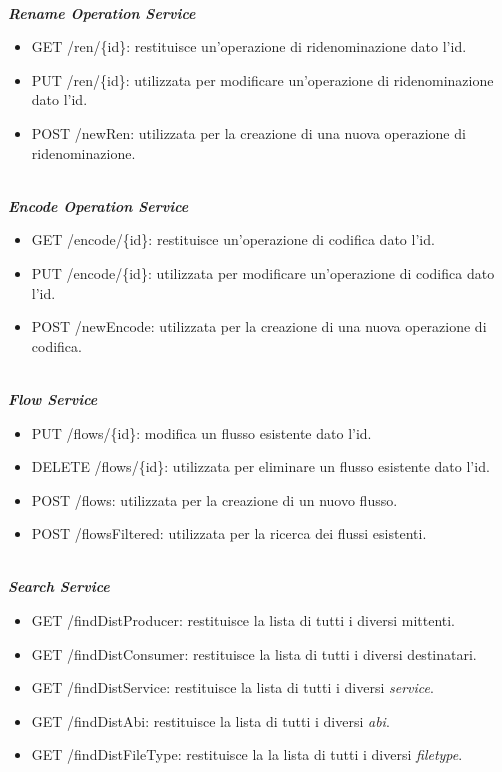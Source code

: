 \ \\
\textbf{\textit{Rename Operation Service}}
\begin{itemize}
    \item GET /ren/\{id\}: restituisce un'operazione di ridenominazione dato l'id.
    \item PUT /ren/\{id\}: utilizzata per modificare un'operazione di ridenominazione dato l'id.
    \item POST /newRen: utilizzata per la creazione di una nuova operazione di ridenominazione.
\end{itemize}

\ \\
\textbf{\textit{Encode Operation Service}}
\begin{itemize}
    \item GET /encode/\{id\}: restituisce un'operazione di codifica dato l'id.
    \item PUT /encode/\{id\}: utilizzata per modificare un'operazione di codifica dato l'id.
    \item POST /newEncode: utilizzata per la creazione di una nuova operazione di codifica.
\end{itemize}

\ \\
\textbf{\textit{Flow Service}}
\begin{itemize}
    \item PUT /flows/\{id\}: modifica un flusso esistente dato l'id.
    \item DELETE /flows/\{id\}: utilizzata per eliminare un flusso esistente dato l'id.
    \item POST /flows: utilizzata per la creazione di un nuovo flusso.
    \item POST /flowsFiltered: utilizzata per la ricerca dei flussi esistenti.
\end{itemize}

\ \\
\textbf{\textit{Search Service}}
\begin{itemize}
    \item GET /findDistProducer: restituisce la lista di tutti i diversi mittenti.
    \item GET /findDistConsumer: restituisce la lista di tutti i diversi destinatari.
    \item GET /findDistService: restituisce la lista di tutti i diversi \textit{service}.
    \item GET /findDistAbi: restituisce la lista di tutti i diversi \textit{abi}.
    \item GET /findDistFileType: restituisce la la lista di tutti i diversi \textit{filetype}.
\end{itemize}

